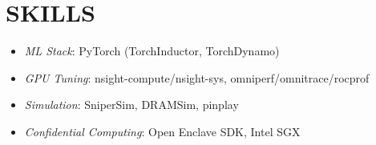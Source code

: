 \section{SKILLS}
    \resumeItemListStart
            \begin{itemize}
            \item[] \textit{ML Stack}: PyTorch (TorchInductor, TorchDynamo)
            \item[] \textit{GPU Tuning}: nsight-compute/nsight-sys, omniperf/omnitrace/rocprof
            \item[] \textit{Simulation}: SniperSim, DRAMSim, pinplay
            \item[] \textit{Confidential Computing}: Open Enclave SDK, Intel SGX
            \end{itemize}

    \resumeItemListEnd